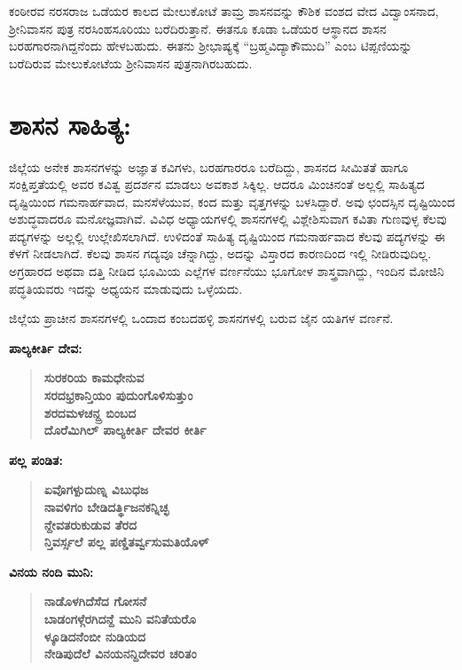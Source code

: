 ಕಂಠೀರವ ನರಸರಾಜ ಒಡೆಯರ ಕಾಲದ ಮೇಲುಕೋಟೆ ತಾಮ್ರ ಶಾಸನವನ್ನು ಕೌಶಿಕ ವಂಶದ ವೇದ ವಿದ್ವಾಂಸನಾದ, ಶ‍್ರೀನಿವಾಸನ ಪುತ್ರ ನರಸಿಂಹಸೂರಿಯು ಬರೆದಿರುತ್ತಾನೆ. ಈತನೂ ಕೂಡಾ ಒಡೆಯರ ಆಸ್ಥಾನದ ಶಾಸನ ಬರಹಗಾರನಾಗಿದ್ದ\-ನೆಂದು ಹೇಳಬಹುದು. ಈತನು ಶ‍್ರೀಭಾಷ್ಯಕ್ಕೆ “ಬ್ರಹ್ಮವಿದ್ಯಾಕೌಮುದಿ” ಎಂಬ ಟಿಪ್ಪಣಿಯನ್ನು ಬರೆದಿರುವ ಮೇಲುಕೋಟೆಯ ಶ‍್ರೀನಿವಾಸನ ಪುತ್ರನಾಗಿರಬಹುದು.


\section{ಶಾಸನ ಸಾಹಿತ್ಯ:}

ಜಿಲ್ಲೆಯ ಅನೇಕ ಶಾಸನಗಳನ್ನು ಅಜ್ಞಾತ ಕವಿಗಳು, ಬರಹಗಾರರೂ ಬರೆದಿದ್ದು, ಶಾಸನದ ಸೀಮಿತತೆ ಹಾಗೂ ಸಂಕ್ಷಿಪ್ತತೆಯಲ್ಲಿ ಅವರ ಕವಿತ್ವ ಪ್ರದರ್ಶನ ಮಾಡಲು ಅವಕಾಶ ಸಿಕ್ಕಿಲ್ಲ. ಆದರೂ ಮಿಂಚಿನಂತೆ ಅಲ್ಲಲ್ಲಿ ಸಾಹಿತ್ಯದ ದೃಷ್ಟಿಯಿಂದ ಗಮನಾರ್ಹವಾದ, ಮನಸೆಳೆಯುವ, ಕಂದ ಮತ್ತು ವೃತ್ತಗಳನ್ನು ಬಳಸಿದ್ದಾರೆ. ಅವು ಛಂದಸ್ಸಿನ ದೃಷ್ಟಿಯಿಂದ ಅಶುದ್ಧವಾದರೂ ಮನೋಜ್ಞವಾಗಿವೆ. ವಿವಿಧ ಅಧ್ಯಾಯಗಳಲ್ಲಿ ಶಾಸನಗಳಲ್ಲಿ ವಿಶ್ಲೇಶಿಸುವಾಗ ಕವಿತಾ ಗುಣವುಳ್ಳ ಕೆಲವು ಪದ್ಯಗಳನ್ನು ಅಲ್ಲಲ್ಲಿ ಉಲ್ಲೇಖಿಸಲಾಗಿದೆ. ಉಳಿದಂತೆ ಸಾಹಿತ್ಯ ದೃಷ್ಟಿಯಿಂದ ಗಮನಾರ್ಹವಾದ ಕೆಲವು ಪದ್ಯಗಳನ್ನು ಈ ಕೆಳಗೆ ನೀಡಲಾಗಿದೆ. ಕೆಲವು ಶಾಸನ ಗದ್ಯವೂ ಚೆನ್ನಾಗಿದ್ದು, ಅದನ್ನು ವಿಸ್ತಾರದ ಕಾರಣದಿಂದ ಇಲ್ಲಿ ನೀಡಿರುವುದಿಲ್ಲ. ಅಗ್ರಹಾರದ ಅಥವಾ ದತ್ತಿ ನೀಡಿದ ಭೂಮಿಯ ಎಲ್ಲೆಗಳ ವರ್ಣನೆಯು ಭೂಗೋಳ ಶಾಸ್ತ್ರವಾಗಿದ್ದು, ಇಂದಿನ ಮೋಜಿನಿ ಪದ್ಧತಿಯವರು ಇದನ್ನು ಅಧ್ಯಯನ ಮಾಡುವುದು ಒಳ್ಳೆಯದು.

ಜಿಲ್ಲೆಯ ಪ್ರಾಚೀನ ಶಾಸನಗಳಲ್ಲಿ ಒಂದಾದ ಕಂಬದಹಳ್ಳಿ ಶಾಸನಗಳಲ್ಲಿ ಬರುವ ಜೈನ ಯತಿಗಳ ವರ್ಣನೆ.

\noindent
\textbf{ಪಾಲ್ಯಕೀರ್ತಿ ದೇವ:}

\begin{verse}
\textbf{ಸುರಕರಿಯ ಕಾಮಧೇನುವ \\ ಸರದಭ್ರಕಾನ್ತಿಯಂ ಪುದುಂಗೊಳಿಸುತ್ತುಂ \\ ಶರದಮಳಚನ್ದ್ರ ಬಿಂಬದ \\ ದೊರೆಮಿಗಿಲ್​ ಪಾಲ್ಯಕೀರ್ತಿ ದೇವರ ಕೀರ್ತಿ}
\end{verse}

\noindent
\textbf{ಪಲ್ಲ ಪಂಡಿತ:}

\begin{verse}
\textbf{ಏವೊಗಳ್ಪುದುಣ್ನ ವಿಬುಧಜ \\ ನಾವಳಿಗಂ ಬೇಡಿದರ್ತ್ಥಿಜನಕನ್ನಿಚ್ಛ \\ ನ್ದೇವತರುಕುಡುವ ತೆರದ \\ ನ್ತಿವರ್ಸ್ಸಲೆ ಪಲ್ಲ ಪಣ್ಡಿತರ್ವ್ವಸುಮತಿಯೊಳ್​}
\end{verse}

\noindent
\textbf{ವಿನಯ ನಂದಿ ಮುನಿ:}

\begin{verse}
\textbf{ನಾಡೊಳಗಿದೆಸೆದ ಗೋಸನೆ \\ ಬಾಡಂಗಳ್ಗೆರಗಿದನ್ದೆ ಮುನಿ ವನಿತೆಯರೊ\\ ಳ್ಕೂಡಿದನೆಂಬೀ ನುಡಿಯದ \\ ನೇಡಿಪುದೆಲೆ ವಿನಯನನ್ದಿದೇವರ ಚರಿತಂ}
\end{verse}

